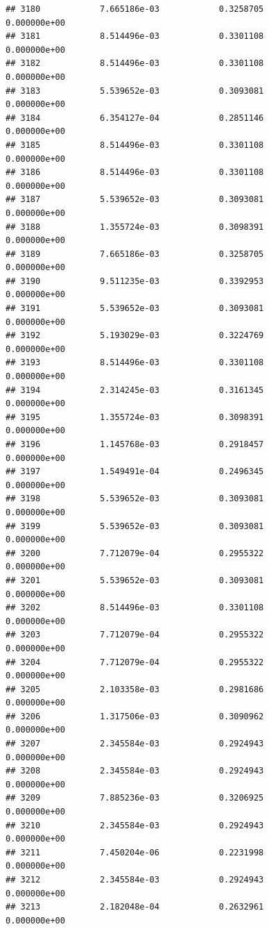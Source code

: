 \documentclass[
]{article}
\begin{document}
\begin{verbatim}
## 3180            7.665186e-03            0.3258705            0.000000e+00
## 3181            8.514496e-03            0.3301108            0.000000e+00
## 3182            8.514496e-03            0.3301108            0.000000e+00
## 3183            5.539652e-03            0.3093081            0.000000e+00
## 3184            6.354127e-04            0.2851146            0.000000e+00
## 3185            8.514496e-03            0.3301108            0.000000e+00
## 3186            8.514496e-03            0.3301108            0.000000e+00
## 3187            5.539652e-03            0.3093081            0.000000e+00
## 3188            1.355724e-03            0.3098391            0.000000e+00
## 3189            7.665186e-03            0.3258705            0.000000e+00
## 3190            9.511235e-03            0.3392953            0.000000e+00
## 3191            5.539652e-03            0.3093081            0.000000e+00
## 3192            5.193029e-03            0.3224769            0.000000e+00
## 3193            8.514496e-03            0.3301108            0.000000e+00
## 3194            2.314245e-03            0.3161345            0.000000e+00
## 3195            1.355724e-03            0.3098391            0.000000e+00
## 3196            1.145768e-03            0.2918457            0.000000e+00
## 3197            1.549491e-04            0.2496345            0.000000e+00
## 3198            5.539652e-03            0.3093081            0.000000e+00
## 3199            5.539652e-03            0.3093081            0.000000e+00
## 3200            7.712079e-04            0.2955322            0.000000e+00
## 3201            5.539652e-03            0.3093081            0.000000e+00
## 3202            8.514496e-03            0.3301108            0.000000e+00
## 3203            7.712079e-04            0.2955322            0.000000e+00
## 3204            7.712079e-04            0.2955322            0.000000e+00
## 3205            2.103358e-03            0.2981686            0.000000e+00
## 3206            1.317506e-03            0.3090962            0.000000e+00
## 3207            2.345584e-03            0.2924943            0.000000e+00
## 3208            2.345584e-03            0.2924943            0.000000e+00
## 3209            7.885236e-03            0.3206925            0.000000e+00
## 3210            2.345584e-03            0.2924943            0.000000e+00
## 3211            7.450204e-06            0.2231998            0.000000e+00
## 3212            2.345584e-03            0.2924943            0.000000e+00
## 3213            2.182048e-04            0.2632961            0.000000e+00

\end{verbatim}
\end{document}
